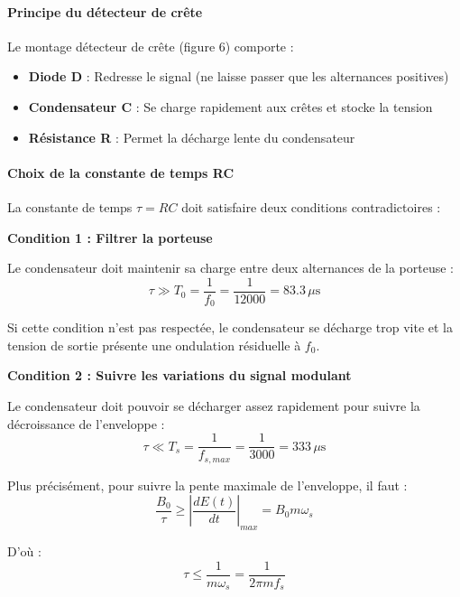 \documentclass[11pt,a4paper]{article}
\begin{document}
\paragraph{Principe du détecteur de crête}

Le montage détecteur de crête (figure 6) comporte :
\begin{itemize}
    \item \textbf{Diode D} : Redresse le signal (ne laisse passer que les alternances positives)
    \item \textbf{Condensateur C} : Se charge rapidement aux crêtes et stocke la tension
    \item \textbf{Résistance R} : Permet la décharge lente du condensateur
\end{itemize}

\paragraph{Choix de la constante de temps RC}

La constante de temps $\tau = RC$ doit satisfaire deux conditions contradictoires :

\textbf{Condition 1 : Filtrer la porteuse}

Le condensateur doit maintenir sa charge entre deux alternances de la porteuse :
\begin{equation}
\tau \gg T_0 = \frac{1}{f_0} = \frac{1}{12000} = 83.3 \, \mu\text{s}
\end{equation}

Si cette condition n'est pas respectée, le condensateur se décharge trop vite et la tension de sortie présente une ondulation résiduelle à $f_0$.

\textbf{Condition 2 : Suivre les variations du signal modulant}

Le condensateur doit pouvoir se décharger assez rapidement pour suivre la décroissance de l'enveloppe :
\begin{equation}
\tau \ll T_s = \frac{1}{f_{s,max}} = \frac{1}{3000} = 333 \, \mu\text{s}
\end{equation}

Plus précisément, pour suivre la pente maximale de l'enveloppe, il faut :
\begin{equation}
\frac{B_0}{\tau} \geq \left|\frac{dE(t)}{dt}\right|_{max} = B_0 m \omega_s
\end{equation}

D'où :
\begin{equation}
\tau \leq \frac{1}{m \omega_s} = \frac{1}{2\pi m f_s}
\end{equation}
\end{document}
